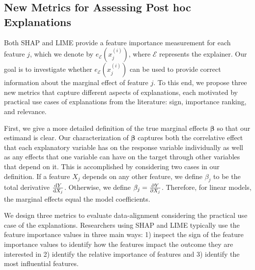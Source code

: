 \documentclass[12pt]{article}  %
\newcommand{\mE}{\mathcal{E}}
\begin{document}
\subsection{New Metrics for Assessing Post hoc Explanations}
   \label{sec:evaluating_faithfulness}
  Both SHAP and LIME provide a feature importance measurement for each feature $j$, which we denote by $e_\mE(x^{(i)}_j)$, where $\mE$ represents the explainer.
   Our goal is to investigate whether $e_\mE(x^{(i)}_j)$ can be used to provide correct information about the marginal effect of feature $j$. To this end, we propose three new metrics that capture different aspects of explanations, each motivated by practical use cases of explanations from the literature: sign, importance ranking, and relevance. 
     
     First, we give a more detailed definition of the true marginal effects $\boldsymbol{\beta}$ so that our estimand is clear. Our characterization of $\boldsymbol{\beta}$ captures both the correlative effect that each explanatory variable has on the response variable individually as well as any effects that one variable can have on the target through other variables that depend on it. This is accomplished by considering two cases in our definition. If a feature $X_j$ depends on any other feature, we define $\beta_j$ to be the total derivative $\dv{Y}{X_j}$. Otherwise, we define $\beta_j = \pdv{Y}{X_j}$. Therefore, for linear models, the marginal effects equal the model coefficients.



         
          We design three metrics to evaluate data-alignment  considering the practical use case of the explanations. Researchers using SHAP and LIME typically use the feature importance values in three main ways: 1) inspect the sign of the feature importance values to identify how the features impact the outcome they are interested in %
         2)  identify the relative importance of features %
         and 3) identify the most influential features. %
\end{document}
